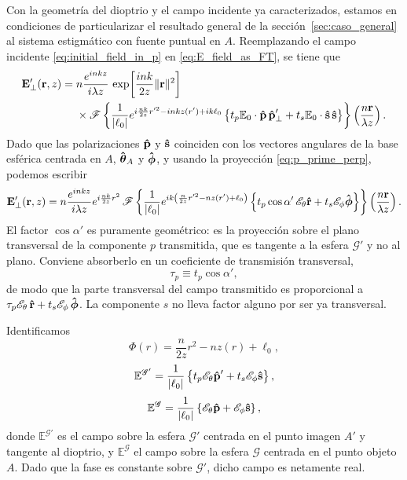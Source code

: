 Con la geometría del dioptrio y el campo incidente ya caracterizados, estamos en condiciones de particularizar el resultado general de la sección~\ref{sec:caso_general} al sistema estigmático con fuente puntual en $A$. Reemplazando el campo incidente \eqref{eq:initial_field_in_p} en \eqref{eq:E_field_as_FT}, se tiene que
\begin{equation}
\begin{aligned}
\vb{E}'_\perp(\vb r,z)
={}&
n\frac{e^{inkz}}{i\lambda z}\,
\exp\!\left[
\frac{ink}{2z}\|\vb r\|^2
\right]
\\
&\times
\mathscr F
\left\{
\frac{1}{|\ell_0|}
e^{i\frac{nk}{2 z}r'^2 - inkz(r') + ik\ell_0}
\left\{
t_p \mathbb E_0 \cdot \bm{\hat{\mathbf{p}}} \, \bm{\hat{\mathbf{p}}}'_\perp
+
t_s \mathbb E_0 \cdot \bm{\hat{\mathbf{s}}} \, \bm{\hat{\mathbf{s}}}
\right\}
\right\}
\left(
\frac{n\vb r}{\lambda z}
\right).
\end{aligned}
\end{equation}
Dado que las polarizaciones $\bm{\hat{\mathbf{p}}}$ y $\bm{\hat{\mathbf{s}}}$ coinciden con los vectores angulares de la base esférica centrada en $A$, $\bm{\hat{\mathbf{\theta}}}_A$ y $\bm{\hat{\mathbf{\phi}}}$, y usando la proyección \eqref{eq:p_prime_perp}, podemos escribir
\begin{equation}
\vb{E}'_\perp(\vb r,z)
=
n\frac{e^{inkz}}{i\lambda z}e^{i\frac{nk}{2z}r^2}
\,
\mathscr F
\left\{
\frac{1}{|\ell_0|}
e^{ik\left( \frac{n}{2 z}r'^2 - nz(r') + \ell_0 \right) }
\left\{
t_p \cos\alpha'\, \mathscr E_{\theta} \bm{\hat{\mathbf{r}}}
+
t_s \mathscr E_{\phi} \bm{\hat{\mathbf{\phi}}}
\right\}
\right\}
\left(
\frac{n\vb r}{\lambda z}
\right).
\label{eq:E_perp_for_ovoid_in_prog}
\end{equation}
El factor $\cos\alpha'$ es puramente geométrico: es la proyección sobre el plano transversal de la componente $p$ transmitida, que es tangente a la esfera $\mathscr G'$ y no al plano. Conviene absorberlo en un coeficiente de transmisión transversal,
\begin{equation}
  \tau_p \equiv t_p\cos\alpha',
  \label{eq:tau_p_def}
\end{equation}
de modo que la parte transversal del campo transmitido es proporcional a $\tau_p\mathscr E_\theta\,\bm{\hat{\mathbf{r}}}+t_s\mathscr E_\phi\,\bm{\hat{\mathbf{\phi}}}$. La componente $s$ no lleva factor alguno por ser ya transversal.

Identificamos
\begin{equation}
  \Phi(r)
  =
  \frac{n}{2z}r^2
  -
  nz(r)
  +
  \ell_0,
\end{equation}
\begin{equation}
  \mathbb E^{\mathscr G'}
  =
  \frac{1}{|\ell_0|}
  \left\{
  t_p \mathscr E_\theta \bm{\hat{\mathbf{p}}}'
  +
  t_s \mathscr E_\phi \bm{\hat{\mathbf{s}}}
  \right\},
  \label{eq:E_G_prime_def}
\end{equation}
\begin{equation}
  \mathbb E^{\mathscr G}
  =
  \frac{1}{|\ell_0|}
  \left\{
  \mathscr E_\theta \bm{\hat{\mathbf{p}}}
  +
  \mathscr E_\phi \bm{\hat{\mathbf{s}}}
  \right\},
  \label{eq:E_G_def}
\end{equation}
donde $\mathbb E^{\mathscr G'}$ es el campo sobre la esfera $\mathscr G'$ centrada en el punto imagen $A'$ y tangente al dioptrio, y $\mathbb E^{\mathscr G}$ el campo sobre la esfera $\mathscr G$ centrada en el punto objeto $A$. Dado que la fase es constante sobre $\mathscr G'$, dicho campo es netamente real.

